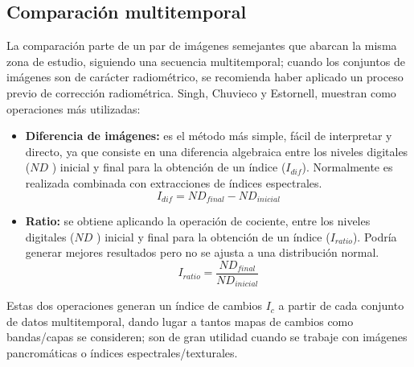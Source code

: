 \subsection{Comparaci\'on multitemporal}\label{subsec:compMult}
La comparaci\'on parte de un par de im\'agenes semejantes que abarcan la misma zona de estudio, siguiendo una secuencia multitemporal; cuando los conjuntos de im\'agenes son de car\'acter radiom\'etrico, se recomienda haber aplicado un proceso previo de correcci\'on radiom\'etrica. Singh\cite{singh1989review}, Chuvieco\cite{chuvieco1998factor} y Estornell\cite{estornell2004analisis}, muestran como operaciones más utilizadas:
	\begin{itemize}
		\item \textbf{Diferencia de im\'agenes:} es el m\'etodo m\'as simple, f\'acil de interpretar y directo, ya que consiste en una diferencia algebraica entre los niveles digitales ($ ND $ ) inicial y final para la obtenci\'on de un \'indice ($ I_{dif} $). Normalmente es realizada combinada  con extracciones de \'indices espectrales.
								\begin{equation}
								I_{dif} = ND_{final}-ND_{inicial}
								\end{equation} 	
				\item \textbf{Ratio:} se obtiene aplicando la operación de cociente, entre los niveles digitales ($ ND $ ) inicial y final para la obtenci\'on de un \'indice ($ I_{ratio} $). Podr\'ia  generar mejores resultados pero no se ajusta a una distribución normal.
										\begin{equation}
										I_{ratio} = \dfrac{ND_{final}}{ND_{inicial}}
										\end{equation} 	

		\end{itemize}
Estas dos operaciones generan un \'indice de cambios $ I_{c}$ a partir de cada conjunto de datos multitemporal, dando lugar a tantos mapas de cambios como bandas/capas se consideren; son de gran utilidad cuando se trabaje con im\'agenes pancrom\'aticas o \'indices espectrales/texturales.
